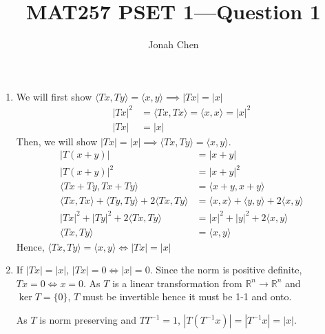 \documentclass[a4paper]{article}
\title{MAT257 PSET 1---Question 1}
\author{Jonah Chen}
\numberwithin{equation}{section}
\newcommand{\R}{\mathbb{R}}
\begin{document}
    \sffamily
    \begin{enumerate}[label=(\alph*)]
        \item We will first show $\langle Tx,Ty\rangle=\langle x,y\rangle\implies|Tx|=|x|$
        \begin{align*}
            |Tx|^2&=\langle Tx, Tx\rangle = \langle x,x\rangle = |x|^2\\
            |Tx|&=|x|
        \end{align*}
        Then, we will show $|Tx|=|x|\implies\langle Tx,Ty\rangle=\langle x,y\rangle$.
        \begin{align*}
            |T(x+y)|&=|x+y|\\
            |T(x+y)|^2&=|x+y|^2\\
            \langle Tx+Ty,Tx+Ty\rangle &=\langle x+y,x+y\rangle\\
            \langle Tx,Tx\rangle + \langle Ty,Ty\rangle + 2\langle Tx,Ty\rangle&=\langle x,x\rangle+\langle y,y\rangle+2\langle x,y\rangle\\
            |Tx|^2+|Ty|^2+2\langle Tx,Ty\rangle&=|x|^2+|y|^2+2\langle x,y\rangle\\
            \langle Tx,Ty\rangle &= \langle x,y\rangle
        \end{align*}
        Hence, $\langle Tx,Ty\rangle=\langle x,y\rangle\iff|Tx|=|x|$
        \item If $|Tx|=|x|$, $|Tx|=0\iff |x|=0$. Since the norm is positive definite, $Tx=0\iff x=0$. As $T$ is a linear transformation from $\R^n\to\R^n$ and $\ker T=\{0\}$, $T$ must be invertible hence it must be 1-1 and onto.
        
        As $T$ is norm preserving and $TT^{-1}=1$, $|T(T^{-1}x)|=|T^{-1}x|=|x|$.
    \end{enumerate}
\end{document}
